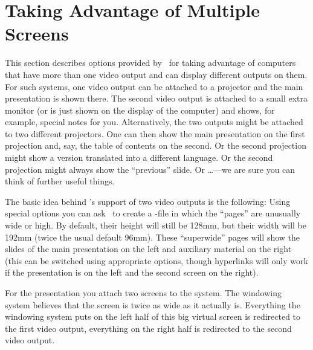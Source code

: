 %
%
%

\section{Taking Advantage of Multiple Screens}
\label{section-twoscreens}

This section describes options provided by \beamer\ for taking advantage of computers that have more than one video output and can display different outputs on them. For such systems, one video output can be attached to a projector and the main presentation is shown there. The second video output is attached to a small extra monitor (or is just shown on the display of the computer) and shows, for example, special notes for you. Alternatively, the two outputs might be attached to two different projectors. One can then show the main presentation on the first projection and, say, the table of contents on the second. Or the second projection might show a version translated into a different language. Or the second projection might always show the ``previous'' slide. Or \ldots---we are sure you can think of further useful things.

The basic idea behind \beamer's support of two video outputs is the following: Using special options you can ask \beamer\ to create a \pdf-file in which the ``pages'' are unusually wide or high. By default, their height will still be 128mm, but their width will be 192mm (twice the usual default 96mm). These ``superwide'' pages will show the slides of the main presentation on the left and auxiliary material on the right (this can be switched using appropriate options, though hyperlinks will only work if the presentation is on the left and the second screen on the right).

For the presentation you attach two screens to the system. The windowing system believes that the screen is twice as wide as it actually is. Everything the windowing system puts on the left half of this big virtual screen is redirected to the first video output, everything on the right half is redirected to the second video output.

